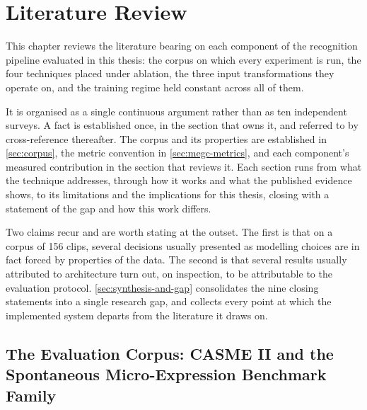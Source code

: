 %
%

\chapter{Literature Review}
\label{ch:literature}

This chapter reviews the literature bearing on each component of the recognition pipeline evaluated in this thesis: the corpus on which every experiment is run, the four techniques placed under ablation, the three input transformations they operate on, and the training regime held constant across all of them.

It is organised as a single continuous argument rather than as ten independent surveys. A fact is established once, in the section that owns it, and referred to by cross-reference thereafter. The corpus and its properties are established in \autoref{sec:corpus}, the metric convention in \autoref{sec:megc-metrics}, and each component's measured contribution in the section that reviews it. Each section runs from what the technique addresses, through how it works and what the published evidence shows, to its limitations and the implications for this thesis, closing with a statement of the gap and how this work differs.

Two claims recur and are worth stating at the outset. The first is that on a corpus of 156 clips, several decisions usually presented as modelling choices are in fact forced by properties of the data. The second is that several results usually attributed to architecture turn out, on inspection, to be attributable to the evaluation protocol. \autoref{sec:synthesis-and-gap} consolidates the nine closing statements into a single research gap, and collects every point at which the implemented system departs from the literature it draws on.


\section{The Evaluation Corpus: CASME II and the Spontaneous Micro-Expression Benchmark Family}
\label{sec:corpus}

